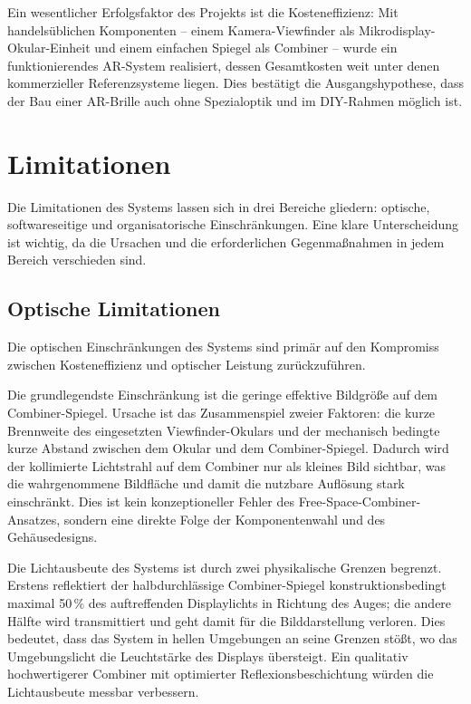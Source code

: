 Ein wesentlicher Erfolgsfaktor des Projekts ist die Kosteneffizienz:
Mit handelsüblichen Komponenten -- einem Kamera-Viewfinder als Mikrodisplay-Okular-Einheit
und einem einfachen Spiegel als Combiner -- wurde ein funktionierendes
AR-System realisiert, dessen Gesamtkosten weit unter denen kommerzieller
Referenzsysteme liegen.
Dies bestätigt die Ausgangshypothese, dass der Bau einer AR-Brille auch
ohne Spezialoptik und im DIY-Rahmen möglich ist.

\section{Limitationen}
\label{sec:Limitationen}

Die Limitationen des Systems lassen sich in drei Bereiche gliedern:
optische, softwareseitige und organisatorische Einschränkungen.
Eine klare Unterscheidung ist wichtig, da die Ursachen und die erforderlichen
Gegenmaßnahmen in jedem Bereich verschieden sind.

\subsection{Optische Limitationen}
\label{subsec:optischeLimitationen}

Die optischen Einschränkungen des Systems sind primär auf den Kompromiss
zwischen Kosteneffizienz und optischer Leistung zurückzuführen.

Die grundlegendste Einschränkung ist die geringe effektive Bildgröße auf dem
Combiner-Spiegel.
Ursache ist das Zusammenspiel zweier Faktoren: die kurze Brennweite des
eingesetzten Viewfinder-Okulars und der mechanisch bedingte kurze Abstand
zwischen dem Okular und dem Combiner-Spiegel.
Dadurch wird der kollimierte Lichtstrahl auf dem Combiner nur als kleines
Bild sichtbar, was die wahrgenommene Bildfläche und damit die nutzbare
Auflösung stark einschränkt.
Dies ist kein konzeptioneller Fehler des Free-Space-Combiner-Ansatzes, sondern
eine direkte Folge der Komponentenwahl und des Gehäusedesigns.

Die Lichtausbeute des Systems ist durch zwei physikalische Grenzen begrenzt.
Erstens reflektiert der halbdurchlässige Combiner-Spiegel konstruktionsbedingt
maximal 50\,\% des auftreffenden Displaylichts in Richtung des Auges;
die andere Hälfte wird transmittiert und geht damit für die Bilddarstellung verloren.
\newpage
Dies bedeutet, dass das System in hellen Umgebungen an seine
Grenzen stößt, wo das Umgebungslicht die Leuchtstärke des Displays übersteigt.
Ein qualitativ hochwertigerer Combiner mit optimierter Reflexionsbeschichtung würden die Lichtausbeute
messbar verbessern.

